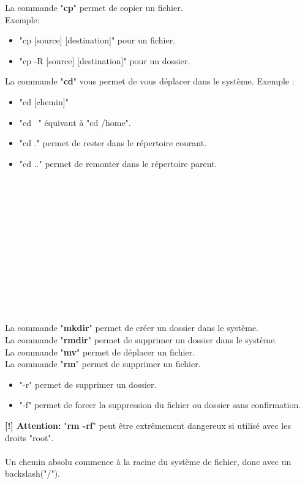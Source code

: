 \documentclass[12pt, a4paper]{article}
\begin{document}
La commande "\textbf{cp}" permet de copier un fichier.\\
Exemple:
\begin{itemize}
\setlength\itemsep{-0.4em}
\item "cp [source] [destination]" pour un fichier.
\item "cp -R [source] [destination]" pour un dossier.\\ 
\end{itemize}
La commande "\textbf{cd}" vous permet de vous déplacer dans le système.
Exemple :
\begin{itemize}
\setlength\itemsep{-0.4em}
\item "cd [chemin]"
\item "cd ~" équivaut à "cd /home".
\item "cd ." permet de rester dans le répertoire courant.
\item "cd .." permet de remonter dans le répertoire parent.\\\\\\\\\\\\\\\\\\\\\\\\\\
\end{itemize}
La commande "\textbf{mkdir}" permet de créer un dossier dans le système.\\
La commande "\textbf{rmdir}" permet de supprimer un dossier dans le système.\\
La commande "\textbf{mv}" permet de déplacer un fichier.\\
La commande "\textbf{rm}" permet de supprimer un fichier.
\begin{itemize}
\setlength\itemsep{-0.4em}
\item "-r" permet de supprimer un dossier.
\item "-f" permet de forcer la suppression du fichier ou dossier sans confirmation.
\end{itemize}
\textbf{[!] Attention:} "\textbf{rm -rf}" peut être extrêmement dangereux si utilisé avec les droits "root".\\
\\
Un chemin absolu commence à la racine du système de fichier, donc avec un backslash("/").\\
\end{document}

